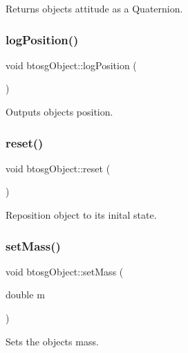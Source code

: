 Returns object\textquotesingle{}s attitude as a Quaternion. \mbox{\label{classbtosgObject_acfd70fa6477c80fd7f29ad7ab9f4f067}} 
\subsubsection{\texorpdfstring{log\+Position()}{logPosition()}}
{\footnotesize\ttfamily void btosg\+Object\+::log\+Position (\begin{DoxyParamCaption}{ }\end{DoxyParamCaption})\hspace{0.3cm}{\ttfamily [inline]}}

Outputs object\textquotesingle{}s position. \mbox{\label{classbtosgObject_a93983f9180dd0672f8779cf2baa78580}} 
\subsubsection{\texorpdfstring{reset()}{reset()}}
{\footnotesize\ttfamily void btosg\+Object\+::reset (\begin{DoxyParamCaption}{ }\end{DoxyParamCaption})\hspace{0.3cm}{\ttfamily [inline]}}

Reposition object to its inital state. \mbox{\label{classbtosgObject_a91da93c82d48b86192f0cbb16054fe57}} 
\subsubsection{\texorpdfstring{set\+Mass()}{setMass()}}
{\footnotesize\ttfamily void btosg\+Object\+::set\+Mass (\begin{DoxyParamCaption}\item[{double}]{m }\end{DoxyParamCaption})\hspace{0.3cm}{\ttfamily [inline]}}

Sets the object\textquotesingle{}s mass. \mbox{\label{classbtosgObject_a6ab7b9e0553dab398b980637788b56a8}} 
